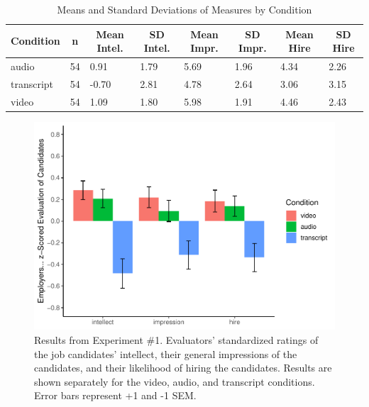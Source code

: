 \documentclass[
  english,
  man]{apa6}
\begin{document}
\begin{table}[tbp]

\begin{center}
\begin{threeparttable}

\caption{\label{tab:table}Means and Standard Deviations of Measures by Condition}

\begin{tabular}{llllllll}
\toprule
Condition & \multicolumn{1}{c}{n} & \multicolumn{1}{c}{Mean Intel.} & \multicolumn{1}{c}{SD Intel.} & \multicolumn{1}{c}{Mean Impr.} & \multicolumn{1}{c}{SD Impr.} & \multicolumn{1}{c}{Mean Hire} & \multicolumn{1}{c}{SD Hire}\\
\midrule
audio & 54 & 0.91 & 1.79 & 5.69 & 1.96 & 4.34 & 2.26\\
transcript & 54 & -0.70 & 2.81 & 4.78 & 2.64 & 3.06 & 3.15\\
video & 54 & 1.09 & 1.80 & 5.98 & 1.91 & 4.46 & 2.43\\
\bottomrule
\end{tabular}

\end{threeparttable}
\end{center}

\end{table}

\begin{figure}
\centering
\includegraphics{APA_report_files/figure-latex/unnamed-chunk-15-1.pdf}
\caption{\label{fig:unnamed-chunk-15}Results from Experiment \#1. Evaluators' standardized ratings of the job candidates' intellect, their general impressions of the candidates, and their likelihood of hiring the candidates. Results are shown separately for the video, audio, and transcript conditions. Error bars represent +1 and -1 SEM.}
\end{figure}
\end{document}
